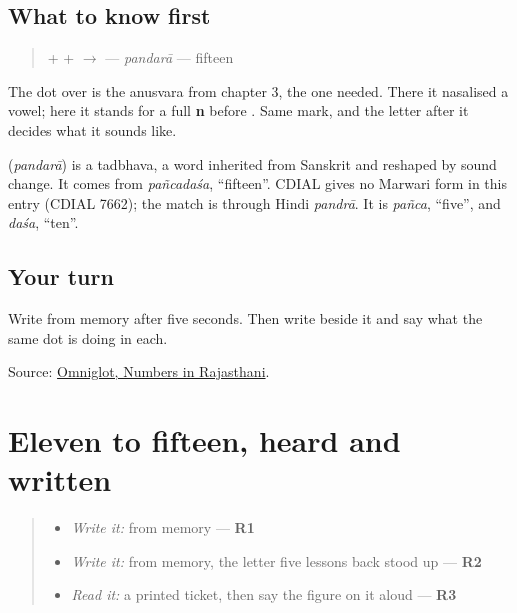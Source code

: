 \subsection*{What to know first}
\begin{quote}
\textbf{} + \textbf{} + \textbf{} $\to$ \textbf{} — \emph{pandarā} — fifteen
\end{quote}

The dot over \textbf{} is the anusvara from chapter 3, the one \textbf{} needed. There it nasalised a vowel; here it stands for a full \textbf{n} before \textbf{}. Same mark, and the letter after it decides what it sounds like.

\begin{cousinweb}
\textbf{} (\emph{pandarā}) is a tadbhava, a word inherited from Sanskrit and reshaped by sound change. It comes from \emph{pañcadaśa}, \textquotedblleft{}fifteen\textquotedblright{}. CDIAL gives no Marwari form in this entry (CDIAL 7662); the match is through Hindi \emph{pandrā}. It is \emph{pañca}, \textquotedblleft{}five\textquotedblright{}, and \emph{daśa}, \textquotedblleft{}ten\textquotedblright{}.
\end{cousinweb}

\subsection*{Your turn}
Write \textbf{} from memory after five seconds. Then write \textbf{} beside it and say what the same dot is doing in each.

\begin{tcolorbox}[breakable,colback=teal!4,colframe=teal!35!black,title={Before you move on}]
Source: \href{https://www.omniglot.com/language/numbers/rajasthani.htm}{Omniglot, Numbers in Rajasthani}.
\end{tcolorbox}
\section[Practice]{Eleven to fifteen, heard and written}

\label{lesson:MW-R37-count-fifteen}



\begin{quote}
\begin{itemize}
\raggedright
  \item \emph{Write it:} \textbf{} from memory — \textbf{R1}
  \item \emph{Write it:} \textbf{} from memory, the letter five lessons back stood up — \textbf{R2}
  \item \emph{Read it:} a printed ticket, then say the figure on it aloud — \textbf{R3}
\end{itemize}
\end{quote}

